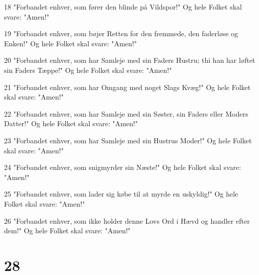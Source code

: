 \par 18 "Forbandet enhver, som fører den blinde på Vildspor!" Og hele Folket skal svare: "Amen!"
\par 19 "Forbandet enhver, som bøjer Retten for den fremmede, den faderløse og Enken!" Og hele Folket skal svare: "Amen!"
\par 20 "Forbandet enhver, som har Samleje med sin Faders Hustru; thi han har løftet sin Faders Tæppe!" Og hele Folket skal svare: "Amen!"
\par 21 "Forbandet enhver, som har Omgang med noget Slags Kvæg!" Og hele Folket skal svare: "Amen!"
\par 22 "Forbandet enhver, som har Samleje med sin Søster, sin Faders eller Moders Datter!" Og hele Folket skal svare: "Amen!"
\par 23 "Forbandet enhver, som har Samleje med sin Hustrus Moder!" Og hele Folket skal svare: "Amen!"
\par 24 "Forbandet enhver, som snigmyrder sin Næste!" Og hele Folket skal svare: "Amen!"
\par 25 "Forbandet enhver, som lader sig købe til at myrde en uskyldig!" Og hele Folket skal svare: "Amen!"
\par 26 "Forbandet enhver, som ikke holder denne Lovs Ord i Hævd og handler efter dem!" Og hele Folket skal svare: "Amen!"

\chapter{28}

